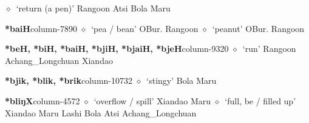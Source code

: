 \hspace{1ex}
         $\diamond$~`return (a pen)'
         Rangoon 
\hspace{1ex}
         Atsi 
\hspace{1ex}
         Bola 
\hspace{1ex}
         Maru 
  \item {\footnotesize \textbf{*baiH}}{\tiny column-7890}
         $\diamond$~`pea / bean'
         OBur. 
\hspace{1ex}
         Rangoon 
\hspace{1ex}
         $\diamond$~`peanut'
         OBur. 
\hspace{1ex}
         Rangoon 
  \item {\footnotesize \textbf{*beH, *biH, *baiH, *bjiH, *bjaiH, *bjeH}}{\tiny column-9320}
         $\diamond$~`run'
         Rangoon 
\hspace{1ex}
         Achang\_Longchuan 
\hspace{1ex}
         Xiandao 
  \item {\footnotesize \textbf{*bjik, *blik, *brik}}{\tiny column-10732}
         $\diamond$~`stingy'
         Bola 
\hspace{1ex}
         Maru 
  \item {\footnotesize \textbf{*bliŋX}}{\tiny column-4572}
         $\diamond$~`overflow / spill'
         Xiandao 
\hspace{1ex}
         Maru 
\hspace{1ex}
         $\diamond$~`full, be / filled up'
         Xiandao 
\hspace{1ex}
         Maru 
\hspace{1ex}
         Lashi 
\hspace{1ex}
         Bola 
\hspace{1ex}
         Atsi 
\hspace{1ex}
         Achang\_Longchuan 
\hspace{1ex}
